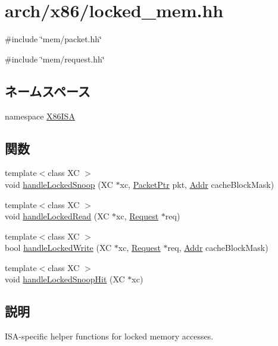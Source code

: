 \hypertarget{x86_2locked__mem_8hh}{
\section{arch/x86/locked\_\-mem.hh}
\label{x86_2locked__mem_8hh}
}
{\ttfamily \#include \char`\"{}mem/packet.hh\char`\"{}}\par
{\ttfamily \#include \char`\"{}mem/request.hh\char`\"{}}\par
\subsection*{ネームスペース}
\begin{DoxyCompactItemize}
\item 
namespace \hyperlink{namespaceX86ISA}{X86ISA}
\end{DoxyCompactItemize}
\subsection*{関数}
\begin{DoxyCompactItemize}
\item 
{\footnotesize template$<$class XC $>$ }\\void \hyperlink{namespaceX86ISA_acda735ab07a398b2f35ba3812e5b389a}{handleLockedSnoop} (XC $\ast$xc, \hyperlink{classPacket}{PacketPtr} pkt, \hyperlink{base_2types_8hh_af1bb03d6a4ee096394a6749f0a169232}{Addr} cacheBlockMask)
\item 
{\footnotesize template$<$class XC $>$ }\\void \hyperlink{namespaceX86ISA_ae25812b653903deff64ba9ec77bbb621}{handleLockedRead} (XC $\ast$xc, \hyperlink{classRequest}{Request} $\ast$req)
\item 
{\footnotesize template$<$class XC $>$ }\\bool \hyperlink{namespaceX86ISA_a3a214e9047351ab4edcf64937e08de6d}{handleLockedWrite} (XC $\ast$xc, \hyperlink{classRequest}{Request} $\ast$req, \hyperlink{base_2types_8hh_af1bb03d6a4ee096394a6749f0a169232}{Addr} cacheBlockMask)
\item 
{\footnotesize template$<$class XC $>$ }\\void \hyperlink{namespaceX86ISA_ad398093a88ab6b5d6d11b250b3fe796f}{handleLockedSnoopHit} (XC $\ast$xc)
\end{DoxyCompactItemize}


\subsection{説明}
ISA-\/specific helper functions for locked memory accesses. 